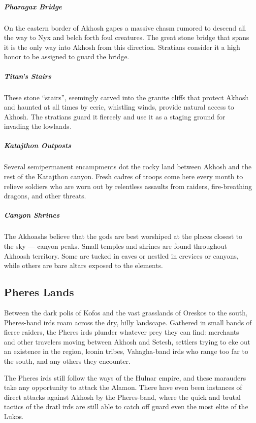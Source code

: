         \subparagraph{Pharagax Bridge} On the eastern border of Akhosh gapes a massive chasm rumored to descend all the way to Nyx and belch forth foul creatures.
        The great stone bridge that spans it is the only way into Akhosh from this direction.
        Stratians consider it a high honor to be assigned to guard the bridge.

        \subparagraph{Titan's Stairs} These stone ``stairs'', seemingly carved into the granite cliffs that protect Akhosh and haunted at all times by eerie, whistling winds, provide natural access to Akhosh.
        The stratians guard it fiercely and use it as a staging ground for invading the lowlands.

        \subparagraph{Katajthon Outposts} Several semipermanent encampments dot the rocky land between Akhosh and the rest of the Katajthon canyon.
        Fresh cadres of troops come here every month to relieve soldiers who are worn out by relentless assaults from raiders, fire-breathing dragons, and other threats.

        \subparagraph{Canyon Shrines} The Akhoashs believe that the gods are best worshiped at the places closest to the sky --- canyon peaks.
        Small temples and shrines are found throughout Akhoash territory.
        Some are tucked in caves or nestled in crevices or canyons, while others are bare altars exposed to the elements.

\subsection*{Pheres Lands}
    Between the dark polis of Kofos and the vast grasslands of Oreskos to the south, Pheres-band irds roam across the dry, hilly landscape.
    Gathered in small bands of fierce raiders, the Pheres irds plunder whatever prey they can find: merchants and other travelers moving between Akhosh and Setesh, settlers trying to eke out an existence in the region, leonin tribes, Vahagha-band irds who range too far to the south, and any others they encounter.

    The Pheres irds still follow the ways of the Hulnar empire, and these marauders take any opportunity to attack the Alamon.
    There have even been instances of direct attacks against Akhosh by the Pheres-band, where the quick and brutal tactics of the dratl irds are still able to catch off guard even the most elite of the Lukos.

